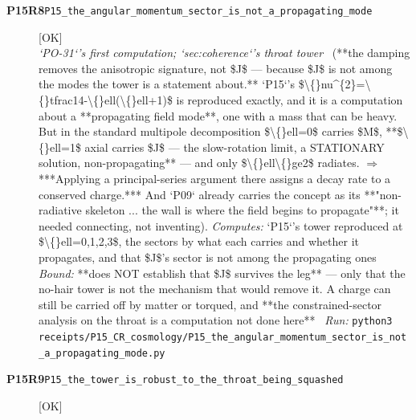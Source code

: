 \begin{description}
\item[\textbf{P15R8}\quad\texttt{P15\_the\_angular\_momentum\_sector\_is\_not\_a\_propagating\_mode}]\hfill\textsf{[OK]}\\
\textit{`PO-31`'s first computation; `sec:coherence`'s throat tower} \ (**the damping removes the anisotropic signature, not \$J\$ --- because \$J\$ is not among the modes the tower is a statement about.** `P15`'s \$\textbackslash\{\}nu\textasciicircum{}\{2\}=\textbackslash\{\}tfrac14-\textbackslash\{\}ell(\textbackslash\{\}ell+1)\$ is reproduced exactly, and it is a computation about a **propagating field mode**, one with a mass that can be heavy. But in the standard multipole decomposition \$\textbackslash\{\}ell=0\$ carries \$M\$, **\$\textbackslash\{\}ell=1\$ axial carries \$J\$ --- the slow-rotation limit, a STATIONARY solution, non-propagating** --- and only \$\textbackslash\{\}ell\textbackslash\{\}ge2\$ radiates. \ensuremath{\Rightarrow} ***Applying a principal-series argument there assigns a decay rate to a conserved charge.***  And `P09` already carries the concept as its **"non-radiative skeleton ... the wall is where the field begins to propagate"**; it needed connecting, not inventing). 
\emph{Computes:} `P15`'s tower reproduced at \$\textbackslash\{\}ell=0,1,2,3\$, the sectors by what each carries and whether it propagates, and that \$J\$'s sector is not among the propagating ones
 \emph{Bound:}  **does NOT establish that \$J\$ survives the leg** --- only that the no-hair tower is not the mechanism that would remove it. A charge can still be carried off by matter or torqued, and **the constrained-sector analysis on the throat is a computation not done here**
\ \emph{Run:} \texttt{python3 receipts/P15\_CR\_cosmology/P15\_the\_angular\_momentum\_sector\_is\_not\_a\_propagating\_mode.py}
\item[\textbf{P15R9}\quad\texttt{P15\_the\_tower\_is\_robust\_to\_the\_throat\_being\_squashed}]\hfill\textsf{[OK]}\\

\end{description}
